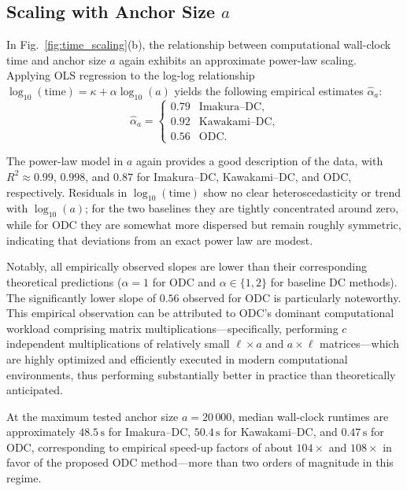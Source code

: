 \documentclass[final,3p,times]{elsarticle}
\theoremstyle{plain}
\begin{document}
\subsection{Scaling with Anchor Size \texorpdfstring{\(a\)}{a}}
\label{subsec:scaling-a}

In Fig.~\ref{fig:time_scaling}(b), the relationship between computational wall-clock time and anchor size \(a\) again exhibits an approximate power-law scaling. Applying OLS regression to the log-log relationship \(\log_{10}(\text{time}) = \kappa + \alpha \log_{10}(a)\) yields the following empirical estimates \(\widehat{\alpha}_{a}\):
\begin{equation}
\widehat{\alpha}_{a} =
\begin{cases}
0.79 & \text{Imakura--DC},\\[2pt]
0.92 & \text{Kawakami--DC},\\[2pt]
0.56 & \text{ODC}.
\end{cases}
\end{equation}

The power-law model in \(a\) again provides a good description of the data, with \(R^2 \approx 0.99\), \(0.998\), and \(0.87\) for Imakura--DC, Kawakami--DC, and ODC, respectively. Residuals in \(\log_{10}(\text{time})\) show no clear heteroscedasticity or trend with \(\log_{10}(a)\); for the two baselines they are tightly concentrated around zero, while for ODC they are somewhat more dispersed but remain roughly symmetric, indicating that deviations from an exact power law are modest.

Notably, all empirically observed slopes are lower than their corresponding theoretical predictions (\(\alpha=1\) for ODC and \(\alpha\in\{1,2\}\) for baseline DC methods). The significantly lower slope of \(0.56\) observed for ODC is particularly noteworthy. This empirical observation can be attributed to ODC's dominant computational workload comprising matrix multiplications---specifically, performing \(c\) independent multiplications of relatively small \(\ell\times a\) and \(a\times \ell\) matrices---which are highly optimized and efficiently executed in modern computational environments, thus performing substantially better in practice than theoretically anticipated.

At the maximum tested anchor size \(a = 20\,000\), median wall-clock runtimes are approximately \(48.5\,\mathrm{s}\) for Imakura--DC, \(50.4\,\mathrm{s}\) for Kawakami--DC, and \textbf{\(0.47\,\mathrm{s}\)} for ODC, corresponding to empirical speed-up factors of about \(104\times\) and \(108\times\) in favor of the proposed ODC method—more than two orders of magnitude in this regime.
\end{document}
